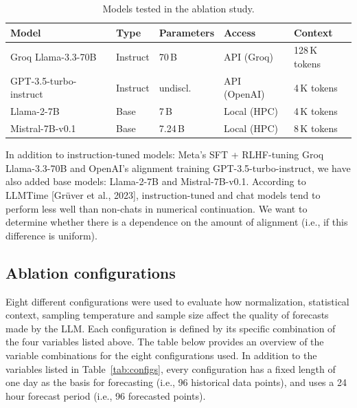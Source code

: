 \documentclass[11pt,a4paper]{article}
\begin{document}
\begin{table}[H]
\centering
\caption{Models tested in the ablation study.}
\label{tab:models}
\small
\begin{tabular}{lllll}
\toprule
Model & Type & Parameters & Access & Context \\
\midrule
Groq Llama-3.3-70B   & Instruct & 70\,B   & API (Groq)   & 128\,K tokens \\
GPT-3.5-turbo-instruct & Instruct & undiscl. & API (OpenAI) & 4\,K tokens \\
Llama-2-7B           & Base     & 7\,B    & Local (HPC)  & 4\,K tokens \\
Mistral-7B-v0.1      & Base     & 7.24\,B & Local (HPC)  & 8\,K tokens \\
\bottomrule
\end{tabular}
\end{table}

In addition to instruction-tuned models: Meta’s SFT + RLHF-tuning Groq Llama-3.3-70B and OpenAI’s alignment training GPT-3.5-turbo-instruct, we have also added base models: Llama-2-7B and Mistral-7B-v0.1. According to LLMTime [Grüver et al., 2023], instruction-tuned and chat models tend to perform less well than non-chats in numerical continuation. We want to determine whether there is a dependence on the amount of alignment (i.e., if this difference is uniform).

\subsection{Ablation configurations}

Eight different configurations were used to evaluate how normalization, statistical context, sampling temperature and sample size affect the quality of forecasts made by the LLM. Each configuration is defined by its specific combination of the four variables listed above. The table below provides an overview of the variable combinations for the eight configurations used. 
In addition to the variables listed in Table~\ref{tab:configs}, every configuration has a fixed length of one day as the basis for forecasting (i.e., 96 historical data points), and uses a 24 hour forecast period (i.e., 96 forecasted points).
\end{document}
